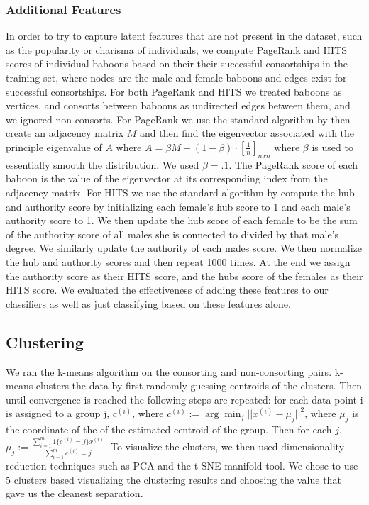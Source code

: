 \documentclass[twoside,twocolumn,paper=letter,fontsize=11pt]{article}
\begin{document}
\subsubsection*{Additional Features}

In order to try to capture latent features that are not present in the dataset,
such as the popularity or charisma of individuals, we compute PageRank and HITS scores of individual baboons based on their their successful consortships in the
training set, where nodes are the male and female baboons and edges exist for
successful consortships.  For both PageRank and HITS we treated baboons as vertices, and consorts between baboons as undirected edges between them, and we ignored non-consorts. For PageRank we use the standard algorithm by \cite{Domingos:2002} then create an adjacency matrix $M$ and then find the eigenvector associated with the principle eigenvalue of $A$ where $A=\beta M+(1-\beta)\cdot[\frac{1}{n}]_{nxn}$ where $\beta$ is used to essentially smooth the distribution. We used $\beta=.1$. The PageRank score of each baboon is the value of the eigenvector at its corresponding index from the adjacency matrix. For HITS we use the standard algorithm by \cite{Kleinberg:1998} compute the hub and authority score by initializing each female's hub score to 1 and each male's authority score to 1. We then update the hub score of each female to be the sum of the authority score of all males she is connected to divided by that male's degree. We similarly update the authority of each males score. We then normalize the hub and authority scores and then repeat 1000 times. At the end we assign the authority score as their HITS score, and the hubs score of the females as their HITS score.
We evaluated the effectiveness of adding these features to our classifiers as well
as just classifying based on these features alone.

\subsection{Clustering}

We ran the k-means algorithm on the consorting and
non-consorting pairs. k-means clusters the data by first randomly guessing
centroids of the clusters. Then until convergence is reached the following steps
are repeated: for each data
point i is assigned to a group j, $c^{(i)}$, where
$c^{(i)}:=\arg\min_{j}||x^{(i)}-\mu_j||^2$, where $\mu_j$ is the coordinate of
the of the estimated centroid of the group. Then for each $j$,
$\mu_j:=\frac{\sum_{i=1}^m1\{c^{(i)}=j\}x^{(i)}}{\sum_{i=1}^m{c^{(i)}=j}}$.
To visualize the clusters, we then used dimensionality
reduction techniques such as PCA and the t-SNE manifold tool. We chose to use 5
clusters based visualizing the clustering results and choosing the value that
gave us the cleanest separation.
\end{document}
